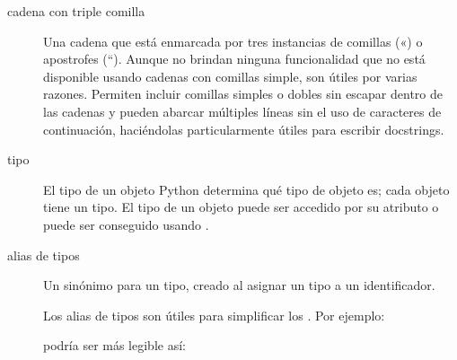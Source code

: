 \documentclass[a4,10pt,spanish]{sphinxmanual}
\begin{document}
\begin{description}
\item[{cadena con triple comilla\label{\detokenize{glossary:term-triple-quoted-string}}}] \leavevmode
\sphinxAtStartPar
Una cadena que está enmarcada por tres instancias de comillas («) o apostrofes (“).  Aunque no brindan ninguna funcionalidad que no está disponible usando cadenas con comillas simple, son útiles por varias razones.  Permiten incluir comillas simples o dobles sin escapar dentro de las cadenas y pueden abarcar múltiples líneas sin el uso de caracteres de continuación, haciéndolas particularmente útiles para escribir docstrings.

\item[{tipo\label{\detokenize{glossary:term-type}}}] \leavevmode
\sphinxAtStartPar
El tipo de un objeto Python determina qué tipo de objeto es; cada objeto tiene un tipo.  El tipo de un objeto puede ser accedido por su atributo  o puede ser conseguido usando .

\item[{alias de tipos\label{\detokenize{glossary:term-type-alias}}}] \leavevmode
\sphinxAtStartPar
Un sinónimo para un tipo, creado al asignar un tipo a un identificador.

\sphinxAtStartPar
Los alias de tipos son útiles para simplificar los {\hyperref[\detokenize{glossary:term-type-hint}]{}}. Por ejemplo:

\begin{sphinxVerbatim}[commandchars=\\\{\}]
 
         \PYG{p}{[}\PYG{p}{[}  \PYG{p}{]}\PYG{p}{]}  \PYG{p}{[}\PYG{p}{[}  \PYG{p}{]}\PYG{p}{]}
\end{sphinxVerbatim}

\sphinxAtStartPar
podría ser más legible así:

\begin{sphinxVerbatim}[commandchars=\\\{\}]
  \PYG{p}{[}  \PYG{p}{]}


\end{sphinxVerbatim}
\end{description}
\end{document}
